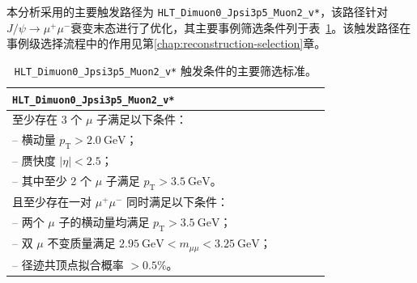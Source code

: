 本分析采用的主要触发路径为 \texttt{HLT\_Dimuon0\_Jpsi3p5\_Muon2\_v*}，该路径针对$J/\psi \to \mu^+\mu^-$衰变末态进行了优化，其主要事例筛选条件列于表~\ref{tab:trigger-conditions}。该触发路径在事例级选择流程中的作用见第\ref{chap:reconstruction-selection}章。

\begin{table}[htbp]
  \centering
  \caption{\texttt{HLT\_Dimuon0\_Jpsi3p5\_Muon2\_v*} 触发条件的主要筛选标准。}
  \label{tab:trigger-conditions}
  \begin{tabular}{>{\raggedright\arraybackslash}p{0.85\linewidth}}
    \toprule
    \texttt{HLT\_Dimuon0\_Jpsi3p5\_Muon2\_v*} \\
    \midrule
    至少存在 3 个 $\mu$ 子满足以下条件：\\
    \quad -- 横动量 $p_{\mathrm{T}} > \SI{2.0}{\giga\eV}$；\\
    \quad -- 赝快度 $|\eta| < 2.5$；\\
    \quad -- 其中至少 2 个 $\mu$ 子满足 $p_{\mathrm{T}} > \SI{3.5}{\giga\eV}$。\\[4pt]
    且至少存在一对 $\mu^+\mu^-$ 同时满足以下条件：\\
    \quad -- 两个 $\mu$ 子的横动量均满足 $p_{\mathrm{T}} > \SI{3.5}{\giga\eV}$；\\
    \quad -- 双 $\mu$ 不变质量满足 $\SI{2.95}{\giga\eV} < m_{\mu\mu} < \SI{3.25}{\giga\eV}$；\\
    \quad -- 径迹共顶点拟合概率 $> 0.5\%$。\\
    \bottomrule
  \end{tabular}
\end{table}

